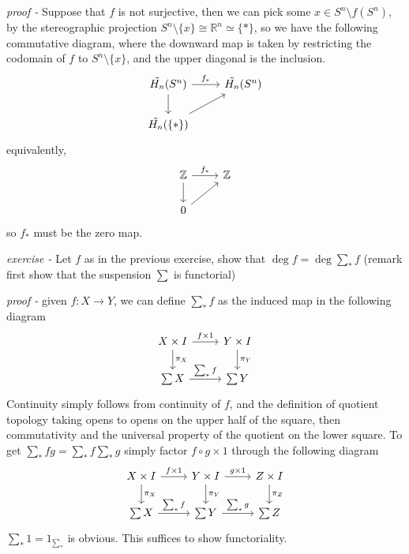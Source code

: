 \documentclass[11pt]{article}
\theoremstyle{definition}
\newcommand{\set}[1]{\{#1\}}
\begin{document}
    \emph{proof - } Suppose that \(f\) is not surjective, then we can pick some \(x \in S^n \setminus f(S^n)\), by the stereographic projection \(S^n \setminus \set{x} \cong \mathbb{R}^n \simeq \set{*}\), so we have the following commutative diagram, where the downward map is taken by restricting the codomain of \(f\) to \(S^n \setminus \set{x}\), and the upper diagonal is the inclusion.
    \begin{equation*}
        \begin{tikzcd}
            \tilde{H_n}(S^n) \arrow[r,"{f_*}"] \arrow[d] &\tilde{H_n}(S^n) \\
            \tilde{H_n}(\set{*}) \arrow[ur]
        \end{tikzcd}
    \end{equation*}
    equivalently,
    \begin{equation*}
        \begin{tikzcd}
            \mathbb{Z} \arrow[r,"{f_*}"] \arrow[d] &\mathbb{Z} \\
            0 \arrow[ur]
        \end{tikzcd}
    \end{equation*}
    so \(f_*\) must be the zero map.


    \emph{exercise - }\label{HEx12} Let \(f\) as in the previous exercise, show that \(\deg f = \deg \sum_* f \) (remark first  show that the suspension \(\sum\) is functorial)

    \emph{proof - } given \(f: X \to Y\), we can define \(\sum_* f\) as the induced map in the following diagram
    \begin{equation*}
        \begin{tikzcd}
            X \times I \arrow[d,"{\pi_X}"] \arrow[r,"{f \times 1}"]& Y \times I \arrow[d,"\pi_Y"] \\
            \sum X \arrow[r,"{\sum_* f}"]& \sum Y
        \end{tikzcd}
    \end{equation*}
    Continuity simply follows from continuity of \(f\), and the definition of quotient topology taking opens to opens on the upper half of the square, then commutativity and the universal property of the quotient on the lower square. To get \(\sum_* fg = \sum_*f \sum_*g\) simply factor \(f\circ g \times 1\) through the following diagram
    \begin{equation*}
        \begin{tikzcd}
            X \times I \arrow[d,"{\pi_X}"] \arrow[r,"{f \times 1}"]& Y \times I \arrow[d,"\pi_Y"] \arrow[r,"{g \times 1}"] &Z \times I \arrow[d,"{\pi_Z}"] \\
            \sum X \arrow[r,"{\sum_* f}"]& \sum Y \arrow[r,"{\sum_* g}"]& \sum Z
        \end{tikzcd}
    \end{equation*}
    \(\sum_*1 = 1_{\sum_*}\) is obvious. This suffices to show functoriality.
\end{document}
